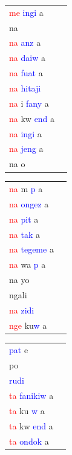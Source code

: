 \documentclass[output=paper,colorlinks,citecolor=brown,
]{langscibook}
\begin{document}
\begin{table}
\begin{minipage}{.24\textwidth}
\begin{tabular}{ll}
\end{tabular}
\end{minipage}
\begin{minipage}{.24\textwidth}
\begin{tabular}{ll} 
\textcolor{red}{me} \textcolor{blue}{ingi} a     \\ 
na   \\
\textcolor{red}{na} \textcolor{blue}{anz} a   \\ 
\textcolor{red}{na} \textcolor{blue}{daiw} a   \\
\textcolor{red}{na} \textcolor{blue}{fuat} a    \\ 
\textcolor{red}{na} \textcolor{blue}{hitaji}  \\
\textcolor{red}{na} i \textcolor{blue}{fany} a   \\ 
\textcolor{red}{na} kw \textcolor{blue}{end} a   \\ 
\textcolor{red}{na} \textcolor{blue}{ingi} a     \\ 
\textcolor{red}{na} \textcolor{blue}{jeng} a      \\
na o  \\
\end{tabular}
\end{minipage}
\begin{minipage}{.24\textwidth}
\begin{tabular}{ll} 
\textcolor{red}{na} m \textcolor{blue}{p} a     \\ 
\textcolor{red}{na} \textcolor{blue}{ongez} a     \\ 
\textcolor{red}{na} \textcolor{blue}{pit} a     \\
\textcolor{red}{na} \textcolor{blue}{tak} a   \\
\textcolor{red}{na} \textcolor{blue}{tegeme} a     \\ 
\textcolor{red}{na} wa \textcolor{blue}{p} a     \\ 
na yo  \\
ngali   \\   
\textcolor{red}{na} \textcolor{blue}{zidi}   \\ 
\textcolor{red}{nge} ku\textcolor{blue}{w} a   \\
\end{tabular}
\end{minipage}
\begin{minipage}{.24\textwidth}
\begin{tabular}{ll} 
\textcolor{blue}{pat} e   \\ 
po   \\
\textcolor{blue}{rudi}   \\
\textcolor{red}{ta} \textcolor{blue}{fanikiw} a    \\ 
\textcolor{red}{ta} ku \textcolor{blue}{w} a   \\
\textcolor{red}{ta} kw \textcolor{blue}{end} a     \\   
\textcolor{red}{ta} \textcolor{blue}{ondok} a   \\   


\end{tabular}
\end{minipage}
\end{table}
\end{document}
